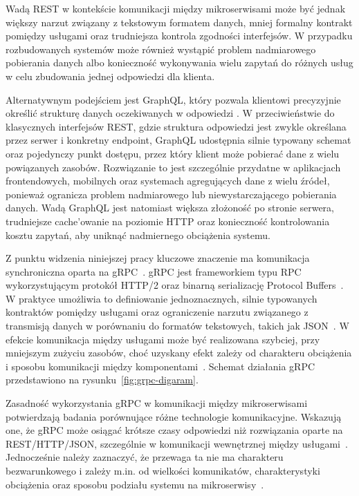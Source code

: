 Wadą REST w kontekście komunikacji między mikroserwisami może być jednak większy narzut związany z tekstowym formatem danych, mniej formalny kontrakt pomiędzy usługami oraz trudniejsza kontrola zgodności interfejsów. W przypadku rozbudowanych systemów może również wystąpić problem nadmiarowego pobierania danych albo konieczność wykonywania wielu zapytań do różnych usług w celu zbudowania jednej odpowiedzi dla klienta.

Alternatywnym podejściem jest GraphQL, który pozwala klientowi precyzyjnie określić strukturę danych oczekiwanych w odpowiedzi \cite{graphqlofficial}. W przeciwieństwie do klasycznych interfejsów REST, gdzie struktura odpowiedzi jest zwykle określana przez serwer i konkretny endpoint, GraphQL udostępnia silnie typowany schemat oraz pojedynczy punkt dostępu, przez który klient może pobierać dane z wielu powiązanych zasobów. Rozwiązanie to jest szczególnie przydatne w aplikacjach frontendowych, mobilnych oraz systemach agregujących dane z wielu źródeł, ponieważ ogranicza problem nadmiarowego lub niewystarczającego pobierania danych. Wadą GraphQL jest natomiast większa złożoność po stronie serwera, trudniejsze cache'owanie na poziomie HTTP oraz konieczność kontrolowania kosztu zapytań, aby uniknąć nadmiernego obciążenia systemu.

Z punktu widzenia niniejszej pracy kluczowe znaczenie ma komunikacja synchroniczna oparta na gRPC~\cite{grpcdocs}. gRPC jest frameworkiem typu RPC wykorzystującym protokół HTTP/2 oraz binarną serializację Protocol Buffers~\cite{protobuf}. W praktyce umożliwia to definiowanie jednoznacznych, silnie typowanych kontraktów pomiędzy usługami oraz ograniczenie narzutu związanego z transmisją danych w porównaniu do formatów tekstowych, takich jak JSON~\cite{kumar2021communicationprotocols,niswar2024restgraphqlgrpc}. W efekcie komunikacja między usługami może być realizowana szybciej, przy mniejszym zużyciu zasobów, choć uzyskany efekt zależy od charakteru obciążenia i sposobu komunikacji między komponentami~\cite{bolanowski2022efficiencyrestgrpc}. Schemat działania gRPC przedstawiono na rysunku~\ref{fig:grpc-digaram}.

Zasadność wykorzystania gRPC w komunikacji między mikroserwisami potwierdzają badania porównujące różne technologie komunikacyjne. Wskazują one, że gRPC może osiągać krótsze czasy odpowiedzi niż rozwiązania oparte na REST/HTTP/JSON, szczególnie w komunikacji wewnętrznej między usługami~\cite{kumar2021communicationprotocols,niswar2024restgraphqlgrpc}. Jednocześnie należy zaznaczyć, że przewaga ta nie ma charakteru bezwarunkowego i zależy m.in. od wielkości komunikatów, charakterystyki obciążenia oraz sposobu podziału systemu na mikroserwisy~\cite{bolanowski2022efficiencyrestgrpc}.

